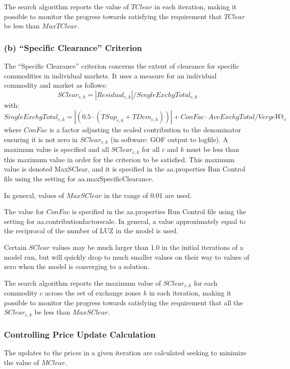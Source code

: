 The search algorithm reports the value of $TClear$ in each iteration, making it possible to monitor the progress towards satisfying the requirement that $TClear$ be less than $MaxTClear$.

\subsubsection{(b) ``Specific Clearance'' Criterion}
The ``Specific Clearance'' criterion concerns the extent of clearance for specific commodities in individual markets. It uses a measure for an individual commodity and market as follows:
\begin{equation}\label{eq:6.38}
SClear_{c,k} = | Residual_{c,k} | / SingleExchgTotal_{c,k}
\end{equation}
\noindent with:
\begin{equation}\label{eq:6.39}
SingleExchgTotal_{c,k} = | (0.5 \cdot (TSup_{c,k} +TDem_{c,k})) | + ConFac \cdot AveExchgTotal / VergeWt_c
\end{equation}
\noindent where $ConFac$ is a factor adjusting the scaled contribution to the denominator ensuring it is not zero in $SClear_{c,k}$ (in software: GOF output to logfile). A maximum value is specified and all $SClear_{c,k}$ for all $c$ and $k$ must be less than this maximum value in order for the criterion to be satisfied. This maximum value is denoted MaxSClear, and it is specified in the aa.properties Run Control file using the setting for aa.maxSpecificClearance.

In general, values of $MaxSClear$ in the range of 0.01 are used.

The value for $ConFac$ is specified in the aa.properties Run Control file using the setting for aa.contributionfactorscale. In general, a value approximately equal to the reciprocal of the number of LUZ in the model is used.

Certain $SClear$ values may be much larger than 1.0 in the initial iterations of a model run, but will quickly drop to much smaller values on their way to values of zero when the model is converging to a solution.

The search algorithm reports the maximum value of $SClear_{c,k}$ for each commodity $c$ across the set of exchange zones $k$ in each iteration, making it possible to monitor the progress towards satisfying the requirement that all the $SClear_{c,k}$ be less than $MaxSClear$.

\subsubsection{Controlling Price Update Calculation}
The updates to the prices in a given iteration are calculated seeking to minimize the value of $MClear$.

